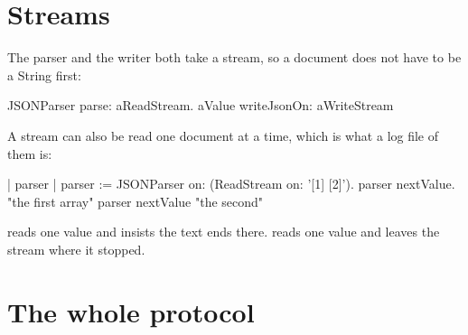 \section{Streams}

The parser and the writer both take a stream, so a document does not have to
be a String first:

\begin{st}
JSONParser parse: aReadStream.
aValue writeJsonOn: aWriteStream
\end{st}

A stream can also be read one document at a time, which is what a log file of
them is:

\begin{st}
| parser |
parser := JSONParser on: (ReadStream on: '[1] [2]').
parser nextValue.       "the first array"
parser nextValue        "the second"
\end{st}

 reads one value and insists the text ends there. 
reads one value and leaves the stream where it stopped.

\section{The whole protocol}

